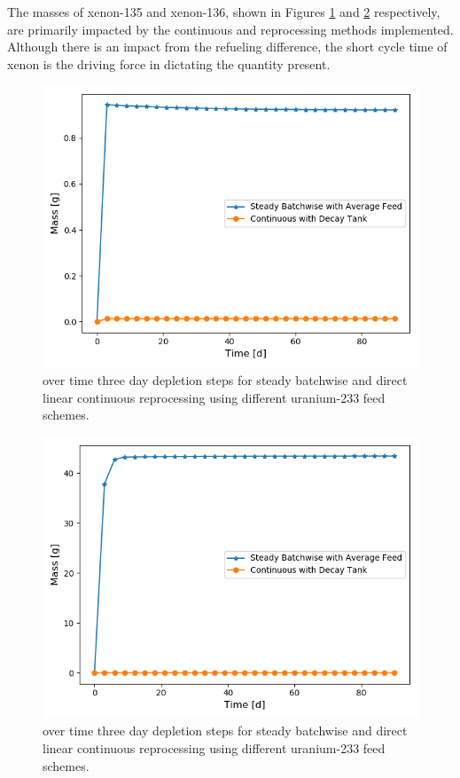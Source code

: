 The masses of xenon-135 and xenon-136, shown in Figures \ref{fig:prev-cur-xe135-plot} and \ref{fig:prev-cur-xe136-plot} respectively, are primarily impacted by the continuous and reprocessing methods implemented.
Although there is an impact from the refueling difference, the short cycle time of xenon is the driving force in dictating the quantity present.


\begin{figure}[H]
  \centering
  \includegraphics[scale=0.7]{images/prev-cur-xe135.png}
  \caption{ over time three day depletion steps for steady batchwise and direct linear continuous reprocessing using different uranium-233 feed schemes.}
   \label{fig:prev-cur-xe135-plot}
\end{figure}

\begin{figure}[H]
  \centering
  \includegraphics[scale=0.7]{images/prev-cur-xe136.png}
  \caption{ over time three day depletion steps for steady batchwise and direct linear continuous reprocessing using different uranium-233 feed schemes.}
   \label{fig:prev-cur-xe136-plot}
\end{figure}

